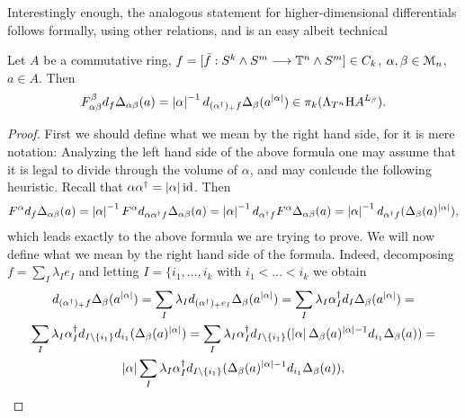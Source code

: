   Interestingly enough, the analogous statement for higher-dimensional differentials follows formally, using other relations, and is an easy albeit technical
  \begin{cor}\label{cor_fdw_relation_arbitrary_dimensions}
  Let $A$ be a commutative ring, $f = [\tilde{f}: S^k \wedge S^m \longrightarrow \mathbb{T}^n \wedge S^m] \in C_k$, $\alpha,\beta \in \mathcal{M}_n$, $a \in A$. Then
  \begin{equation*}
    F_{\alpha\beta}^\beta d_f \Delta_{\alpha\beta} (a) =%
    \abs{\alpha}^{-1}d_{(\alpha^\dagger)_+ f} \Delta_{\beta}(a^{\abs{\alpha}})%
    \in \pi_k (\Lambda_{T^n} \H A ^{L_\beta}).%
  \end{equation*}
  \begin{proof}
   First we should define what we mean by the right hand side, for it is mere notation: Analyzing the left hand side of the above formula one may assume that it is legal to divide through the volume of $\alpha$, and may conlcude the following heuristic. Recall that $\alpha \alpha^\dagger = \left\vert\alpha\right\vert \operatorname{id}$. Then
  \begin{gather*}
    F^\alpha d_f \Delta_{\alpha\beta} (a) = %
      \abs{\alpha}^{-1} F^\alpha d_{\alpha \alpha^\dagger f}%
        \Delta_{\alpha\beta} (a) = %
      \abs{\alpha}^{-1} d_{\alpha^\dagger f} F^\alpha
        \Delta_{\alpha\beta} (a) = %
      \abs{\alpha}^{-1} d_{\alpha^\dagger f}
        ( \Delta_{\beta} (a)^{\abs{\alpha}} ),%
  \end{gather*}
  which leads exactly to the above formula we are trying to prove. We will now define what we mean by the right hand side of the formula. Indeed, decomposing $f = \sum_I \lambda_I e_I$ and letting $I = \{i_1, \ldots , i_k$ with $i_1 < \ldots < i_k$ we obtain
  \begin{gather*}
    d_{(\alpha^\dagger)_+ f} \Delta_{\beta}(a^{\abs{\alpha}}) = %
    \sum_I \lambda_I d_{(\alpha^\dagger)_+ e_I} \Delta_{\beta}
      (a^{\abs{\alpha}}) = %
    \sum_I \lambda_I \alpha^\dagger_I d_I \Delta_{\beta}(a^{\abs{\alpha}}) = \\%
    \sum_I \lambda_I \alpha^\dagger_I d_{I \setminus \{i_1\}} d_{i_1}
      (\Delta_{\beta}(a)^{\abs{\alpha}}) = %
    \sum_I \lambda_I \alpha^\dagger_I d_{I \setminus \{i_1\}} (
      \abs{\alpha} \Delta_{\beta}(a)^{\abs{\alpha}-1} d_{i_1} \Delta_{\beta}(a) ) = \\%
    \abs{\alpha} \sum_I \lambda_I \alpha^\dagger_I d_{I \setminus \{i_1\}}
      (\Delta_{\beta}(a)^{\abs{\alpha}-1} d_{i_1} \Delta_{\beta}(a)),%

\end{gather*}
\end{proof}
\end{cor}
